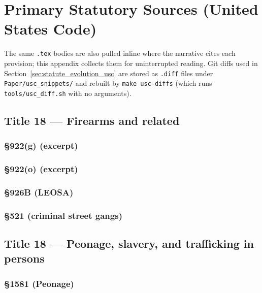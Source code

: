 \chapter{Primary Statutory Sources (United States Code)}
\label{apx:primary-usc}

\USCSourceNote

The same \texttt{.tex} bodies are also pulled inline where the narrative cites each provision; this appendix collects them for uninterrupted reading. Git diffs used in Section~\ref{sec:statute_evolution_usc} are stored as \texttt{.diff} files under \texttt{Paper/usc\_snippets/} and rebuilt by \texttt{make usc-diffs} (which runs \texttt{tools/usc\_diff.sh} with no arguments).

\section*{Title 18 --- Firearms and related}

\subsection*{§922(g) (excerpt)}
\label{apx:usc:18:922g}


\subsection*{§922(o) (excerpt)}
\label{apx:usc:18:922o}


\subsection*{§926B (LEOSA)}
\label{apx:usc:18:926b}


\subsection*{§521 (criminal street gangs)}
\label{apx:usc:18:521}


\section*{Title 18 --- Peonage, slavery, and trafficking in persons}

\subsection*{§1581 (Peonage)}
\label{apx:usc:18:1581}


